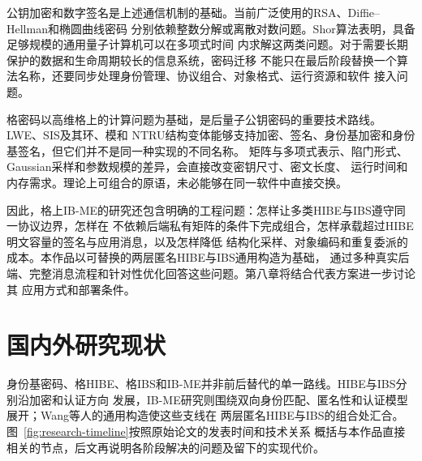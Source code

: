 公钥加密和数字签名是上述通信机制的基础。当前广泛使用的RSA、Diffie--Hellman和椭圆曲线密码
分别依赖整数分解或离散对数问题。Shor算法表明，具备足够规模的通用量子计算机可以在多项式时间
内求解这两类问题\cite{shor1994}。对于需要长期保护的数据和生命周期较长的信息系统，密码迁移
不能只在最后阶段替换一个算法名称，还要同步处理身份管理、协议组合、对象格式、运行资源和软件
接入问题。

格密码以高维格上的计算问题为基础，是后量子公钥密码的重要技术路线。LWE、SIS及其环、模和
NTRU结构变体能够支持加密、签名、身份基加密和身份基签名，但它们并不是同一种实现的不同名称。
矩阵与多项式表示、陷门形式、Gaussian采样和参数规模的差异，会直接改变密钥尺寸、密文长度、
运行时间和内存需求。理论上可组合的原语，未必能够在同一软件中直接交换。

因此，格上IB-ME的研究还包含明确的工程问题：怎样让多类HIBE与IBS遵守同一协议边界，怎样在
不依赖后端私有矩阵的条件下完成组合，怎样承载超过HIBE明文容量的签名与应用消息，以及怎样降低
结构化采样、对象编码和重复委派的成本。本作品以可替换的两层匿名HIBE与IBS通用构造为基础，
通过多种真实后端、完整消息流程和针对性优化回答这些问题。第八章将结合代表方案进一步讨论其
应用方式和部署条件。

\section{国内外研究现状}

身份基密码、格HIBE、格IBS和IB-ME并非前后替代的单一路线。HIBE与IBS分别沿加密和认证方向
发展，IB-ME研究则围绕双向身份匹配、匿名性和认证模型展开；Wang等人的通用构造使这些支线在
两层匿名HIBE与IBS的组合处汇合。图~\ref{fig:research-timeline}按照原始论文的发表时间和技术关系
概括与本作品直接相关的节点，后文再说明各阶段解决的问题及留下的实现代价。


